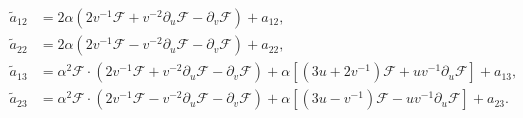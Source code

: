 \documentclass[10pt,a4paper]{amsart}
\begin{document}
\begin{equation} \label{coefficient tilde a} 
	\begin{aligned}
		\tilde{a}_{12} & = 2\alpha ( 2v^{-1} \mathcal{F} + v^{-2}  \partial_{u} \mathcal{F} - \partial_{v} \mathcal{F})  + {a}_{12}, \\
		\tilde{a}_{22} & = 2\alpha (2v^{-1} \mathcal{F} - v^{-2}  \partial_{u} \mathcal{F} - \partial_{v} \mathcal{F}) + {a}_{22},\\
		\tilde{a}_{13} & = \alpha^2 \mathcal{F} \cdot ( 2v^{-1} \mathcal{F} + v^{-2}  \partial_{u} \mathcal{F} - \partial_{v} \mathcal{F} )  + \alpha [(3u + 2v^{-1}) \mathcal{F} + uv^{-1} \partial_{u} \mathcal{F} ] +a_{13}, \\
		\tilde{a}_{23} & =\alpha^2 \mathcal{F} \cdot ( 2v^{-1} \mathcal{F} - v^{-2}  \partial_{u} \mathcal{F} - \partial_{v} \mathcal{F} )  + \alpha [(3u -v^{-1}) \mathcal{F} - uv^{-1} \partial_{u} \mathcal{F} ] +a_{23}.
	\end{aligned}
\end{equation}	
\end{document}
